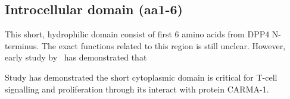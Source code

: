 \subsection{Introcellular domain (aa1-6)}

This short, hydrophilic domain consist of first 6 amino acids from DPP4 N-terminus. The exact functions related to this region is still unclear. However, early study by~\citet{Hong1990} has demonstrated that 

Study has demonstrated the short cytoplasmic domain is critical for T-cell signalling and proliferation through its interact with protein CARMA-1. \cite{Ohnuma_2007}